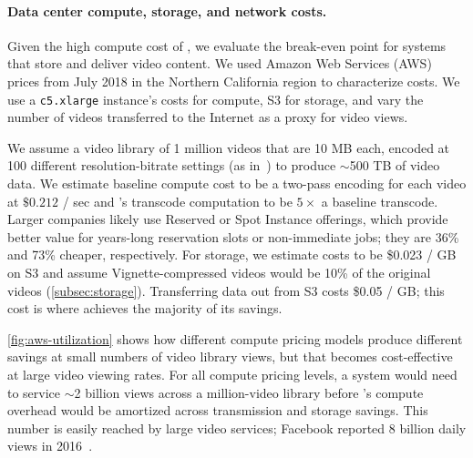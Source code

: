 \paragraph{Data center compute, storage, and network costs. }
Given the high compute cost of \name, we evaluate the break-even point for systems that store and deliver video content.
We used Amazon Web Services (AWS) prices from July 2018 in the Northern California region to characterize costs.
We use a \texttt{c5.xlarge} instance's costs for compute, S3 for storage, and vary the number of videos transferred to the Internet as a proxy for video views.

\awsBreakevenFigure


We assume a video library of 1 million videos that are 10 MB each, encoded at 100 different resolution-bitrate settings (as in~\cite{huang2017sve,netflix2018dynamicopt}) to produce $\sim$500 TB of video data.
We estimate baseline compute cost to be a two-pass encoding for each video at $\$0.212$ / sec and \name's transcode computation to be $5\times$ a baseline transcode.
Larger companies likely use Reserved or Spot Instance offerings, which provide better value for years-long reservation slots or non-immediate jobs; they are 36\% and 73\% cheaper, respectively.
For storage, we estimate costs to be \$0.023 / GB on S3 and assume Vignette-compressed videos would be 10\% of the original videos (\ref{subsec:storage}).
Transferring data out from S3 costs \$0.05 / GB; this cost is where \name achieves the majority of its savings.



\ref{fig:aws-utilization} shows how different compute pricing models produce different savings at small numbers of video library views, but that \name becomes cost-effective at large video viewing rates.
For all compute pricing levels, a system would need to service $\sim$2 billion views across a million-video library before \name's compute overhead would be amortized across transmission and storage savings.
This number is easily reached by large video services; Facebook reported 8 billion daily views in 2016~\cite{fbviews}.

\powerFigure

